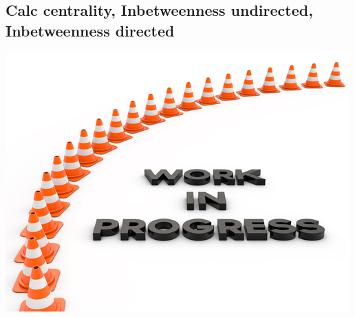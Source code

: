 \subsection{Calc centrality, Inbetweenness undirected, Inbetweenness directed}
\includegraphics{graphics/work_in_progress}
